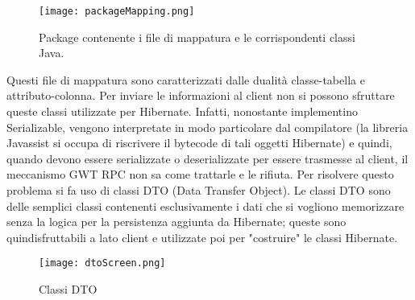 \begin{figure}[!htb]
\centering
\texttt{[image: packageMapping.png]}
\caption{Package contenente i file di mappatura e le corrispondenti classi Java.}\label{fig:mappingPack}
\end{figure}
\FloatBarrier
Questi file di mappatura sono caratterizzati  dalle dualità classe-tabella e attributo-colonna.
Per inviare le informazioni al client non si possono sfruttare queste classi utilizzate per Hibernate. Infatti, nonostante implementino Serializable, vengono interpretate in modo particolare dal compilatore (la libreria Javassist si occupa di riscrivere il bytecode di tali oggetti Hibernate) e quindi, quando devono essere serializzate o deserializzate per essere trasmesse al client, il meccanismo GWT RPC non sa come trattarle e le rifiuta. Per risolvere questo problema si fa uso di classi DTO (Data Transfer Object). Le classi DTO sono delle semplici classi contenenti esclusivamente i dati che si vogliono memorizzare senza la logica per la persistenza aggiunta da Hibernate; queste sono quindisfruttabili a lato client e utilizzate poi per "costruire" le classi Hibernate.
\begin{figure}[!htb]
\centering
\texttt{[image: dtoScreen.png]}
\caption{Classi DTO}\label{fig:dtoPack}
\end{figure}